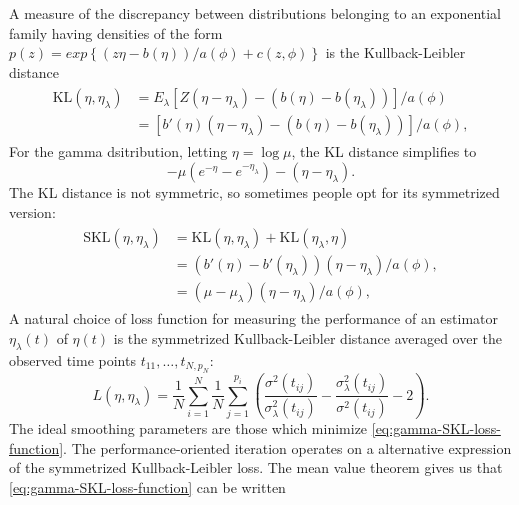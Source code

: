 A measure of the discrepancy between distributions belonging to an exponential family having densities of the form $p\left(z\right) = exp\left\{\left(z \eta - b\left(\eta\right)\right)/a\left(\phi\right) + c\left(z,\phi\right) \right\}$ is the Kullback-Leibler distance
\begin{align}
\begin{split} \label{eq:kl-distance-definition}
\mbox{KL}\left(\eta, \eta_\lambda\right) &= E_\lambda\left[Z \left(\eta - \eta_\lambda \right) - \left(b\left(\eta\right)- b\left(\eta_\lambda\right) \right)\right]/a\left(\phi\right)\\
&=\left[ b'\left(\eta\right) \left(\eta - \eta_\lambda \right) - \left(b\left(\eta\right)- b\left(\eta_\lambda\right) \right)\right]/a\left(\phi\right),
\end{split}
\end{align}
\noindent
For the gamma dsitribution, letting $\eta = \log \mu$, the KL distance simplifies to
\[
-\mu\left( e^{-\eta} - e^{-{\eta_\lambda}}\right) - \left(\eta-{\eta_\lambda}\right).
\]
\noindent
The KL distance is not symmetric, so sometimes people opt for its symmetrized version:
\begin{align}
\begin{split} \label{eq:skl-distance-definition}
\mbox{SKL}\left(\eta, \eta_\lambda\right) &= \mbox{KL}\left(\eta, \eta_\lambda\right) + \mbox{KL}\left(\eta_\lambda, \eta \right)\\
&= \left(b'\left(\eta\right) - b'\left(\eta_\lambda\right) \right)\left( \eta - \eta_\lambda\right)/a\left(\phi\right), \\
&= \left(\mu - \mu_\lambda \right)\left( \eta - \eta_\lambda\right)/a\left(\phi\right),
\end{split}
\end{align}
\noindent
A natural choice of loss function for measuring the performance of an estimator $\eta_\lambda\left(t\right)$ of $\eta \left(t\right)$ is the symmetrized Kullback-Leibler distance averaged over the observed time points $t_{11}, \dots ,  t_{N,p_N}$:
\begin{equation}\label{eq:gamma-SKL-loss-function}
L\left( \eta,\eta_\lambda \right) = \frac{1}{N}\sum_{i=1}^N \frac{1}{N}\sum_{j=1}^{p_i}  \left( \frac{\sigma^2\left(t_{ij}\right)}{\sigma^2_\lambda\left(t_{ij}\right)} - \frac{\sigma^2_\lambda \left(t_{ij}\right)}{\sigma^2\left(t_{ij}\right)} - 2\right).
\end{equation}
\noindent
The ideal smoothing parameters are those which minimize \eqref{eq:gamma-SKL-loss-function}. The performance-oriented iteration operates on a alternative expression of the symmetrized Kullback-Leibler loss. The mean value theorem gives us that \eqref{eq:gamma-SKL-loss-function} can be written

